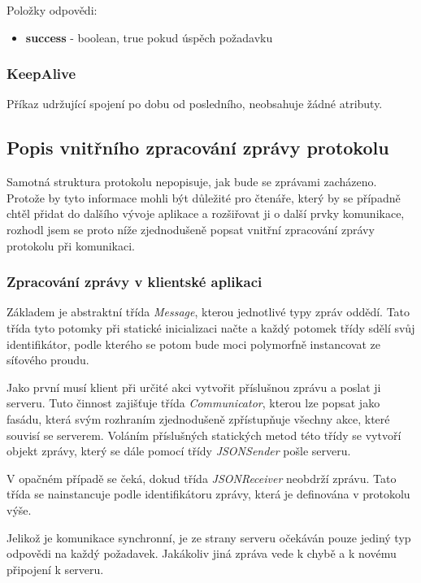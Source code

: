 \documentclass[thesis=B,czech]{FITthesis}[2013/10/20]
\begin{document}
Položky odpovědi:
\begin{itemize}
  \item \textbf{success} - boolean, true pokud úspěch požadavku
\end{itemize}

\subsubsection{KeepAlive}
Příkaz udržující spojení po dobu od posledního, neobsahuje žádné atributy.

\subsection{Popis vnitřního zpracování zprávy protokolu}

Samotná struktura protokolu nepopisuje, jak bude se zprávami zacházeno. Protože by tyto informace mohli být důležité pro čtenáře, který by se případně chtěl přidat do dalšího vývoje aplikace a rozšiřovat ji o další prvky komunikace, rozhodl jsem se proto níže zjednodušeně popsat vnitřní zpracování zprávy protokolu při komunikaci.

\subsubsection{Zpracování zprávy v klientské aplikaci}

Základem je abstraktní třída \textit{Message}, kterou jednotlivé typy zpráv oddědí. Tato třída tyto potomky při statické inicializaci načte a každý potomek třídy sdělí svůj identifikátor, podle kterého se potom bude moci polymorfně instancovat ze síťového proudu.

Jako první musí klient při určité akci vytvořit příslušnou zprávu a poslat ji serveru. Tuto činnost zajišťuje třída \textit{Communicator}, kterou lze popsat jako fasádu, která svým rozhraním zjednodušeně zpřístupňuje všechny akce, které souvisí se serverem. Voláním příslušných statických metod této třídy se vytvoří objekt zprávy, který se dále pomocí třídy \textit{JSONSender} pošle serveru.

V opačném případě se čeká, dokud třída \textit{JSONReceiver} neobdrží zprávu. Tato třída se nainstancuje podle identifikátoru zprávy, která je definována v protokolu výše.

Jelikož je komunikace synchronní, je ze strany serveru očekáván pouze jediný typ odpovědi na každý požadavek. Jakákoliv jiná zpráva vede k chybě a k novému připojení k serveru.
\end{document}
